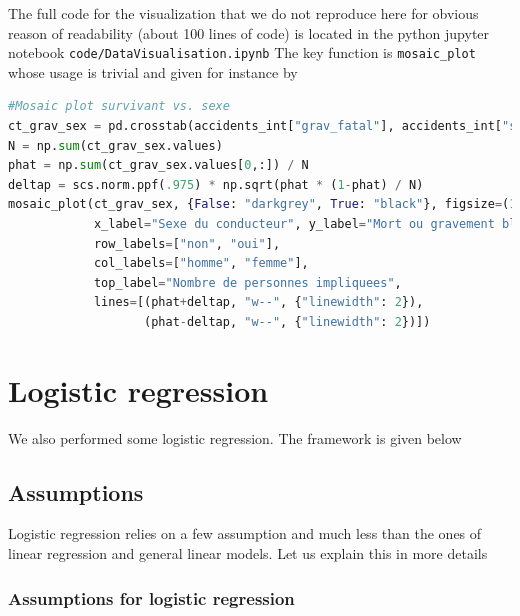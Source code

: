 \documentclass[a4paper]{article}
\theoremstyle{definition}
\theoremstyle{proposition}
\begin{document}
The full code for the visualization that we do not reproduce here for obvious reason of readability (about 100 lines of code) is located in the python jupyter notebook \verb|code/DataVisualisation.ipynb| 
The key function is \verb|mosaic_plot| whose usage is trivial and given for instance by

\begin{lstlisting}[language=Python]
#Mosaic plot survivant vs. sexe
ct_grav_sex = pd.crosstab(accidents_int["grav_fatal"], accidents_int["sexe_cond"])
N = np.sum(ct_grav_sex.values)
phat = np.sum(ct_grav_sex.values[0,:]) / N
deltap = scs.norm.ppf(.975) * np.sqrt(phat * (1-phat) / N)
mosaic_plot(ct_grav_sex, {False: "darkgrey", True: "black"}, figsize=(10,10), pad_x=.01, pad_y=0,
            x_label="Sexe du conducteur", y_label="Mort ou gravement blesse",
            row_labels=["non", "oui"],
            col_labels=["homme", "femme"],
            top_label="Nombre de personnes impliquees",
            lines=[(phat+deltap, "w--", {"linewidth": 2}),
                   (phat-deltap, "w--", {"linewidth": 2})])
\end{lstlisting}






\section{Logistic regression}
We also performed some logistic regression. The framework is given below

\subsection{Assumptions}
Logistic regression relies on a few assumption and much less than the ones of linear regression and general linear models. Let us explain this in more details
\subsubsection{Assumptions for logistic regression}
\end{document}
